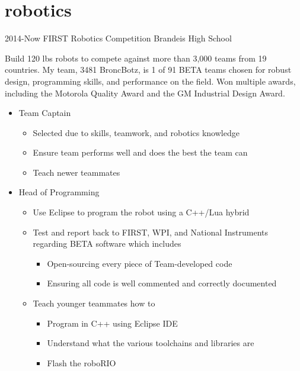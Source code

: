 \documentclass[]{friggeri-cv} %
\begin{document}

\section{robotics}

\begin{entrylist}


\entry
{2014-Now}
{FIRST Robotics Competition}
{Brandeis High School}
{Build 120 lbs robots to compete against more than 3,000 teams from 19 countries. My team, 3481 BroncBotz, is 1 of 91 BETA teams chosen for robust design, programming skills, and performance on the field. Won multiple awards, including the Motorola Quality Award and the GM Industrial Design Award. 
\begin{itemize} 
\item Team Captain 
\begin{itemize} 
	\item Selected due to skills, teamwork, and robotics knowledge 
	\item Ensure team performs well and does the best the team can
	\item Teach newer teammates 
\end{itemize} 
\item Head of Programming 
\begin{itemize}
\item Use Eclipse to program the robot using a C++/Lua hybrid 
\item Test and report back to FIRST, WPI, and National Instruments regarding BETA software which includes 
\begin{itemize}
\item Open-sourcing every piece of Team-developed code 
\item Ensuring all code is well commented and correctly documented 
\end{itemize} 
\item Teach younger teammates how to
\begin{itemize}
\item Program in C++ using Eclipse IDE
\item Understand what the various toolchains and libraries are 
\item Flash the roboRIO  
\end{itemize}

\end{itemize}
\end{itemize}}
\end{entrylist}
\end{document}
